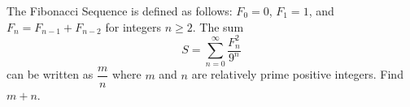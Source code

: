 The Fibonacci Sequence is defined as follows: $F_0 = 0$, $F_1 = 1$, and $F_n = F_{n-1} + F_{n-2}$ for integers $n \ge 2$. The sum \[S =\sum^{\infty}_{n=0}\dfrac{F^2_n}{9^n}\]can be written as $\dfrac{m}{n}$ where $m$ and $n$ are relatively prime positive integers. Find $m + n$.
